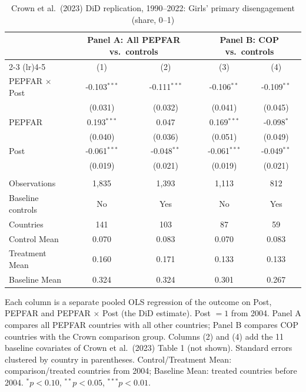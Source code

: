 
\begin{table}[htbp]
   \caption{\label{tab:crown_did_prim_disengage_girls} Crown et al.\ (2023) DiD replication, 1990--2022: Girls' primary disengagement (share, 0--1)}
   \bigskip
   \centering
   \begin{tabular}{lcccc}
      \toprule
       & \multicolumn{2}{c}{Panel A: All PEPFAR vs.\ controls} & \multicolumn{2}{c}{Panel B: COP vs.\ controls} \\ \cmidrule(lr){2-3} \cmidrule(lr){4-5}
                            & (1)            & (2)            & (3)            & (4)\\  
      \midrule 
      PEPFAR $\times$ Post  & -0.103$^{***}$ & -0.111$^{***}$ & -0.106$^{**}$  & -0.109$^{**}$\\   
                            & (0.031)        & (0.032)        & (0.041)        & (0.045)\\   
      PEPFAR                & 0.193$^{***}$  & 0.047          & 0.169$^{***}$  & -0.098$^{*}$\\   
                            & (0.040)        & (0.036)        & (0.051)        & (0.049)\\   
      Post                  & -0.061$^{***}$ & -0.048$^{**}$  & -0.061$^{***}$ & -0.049$^{**}$\\   
                            & (0.019)        & (0.021)        & (0.019)        & (0.021)\\   
       \\
      Observations          & 1,835          & 1,393          & 1,113          & 812\\  
      Baseline controls     & No             & Yes            & No             & Yes\\  
      Countries             & 141            & 103            & 87             & 59\\  
      Control Mean          & 0.070          & 0.083          & 0.070          & 0.083\\  
      Treatment Mean        & 0.160          & 0.171          & 0.133          & 0.133\\  
      Baseline Mean         & 0.324          & 0.324          & 0.301          & 0.267\\  
      \bottomrule
   \end{tabular}
   
   \par \raggedright 
   Each column is a separate pooled OLS regression of the outcome on Post, PEPFAR and PEPFAR $\times$ Post (the DiD estimate). Post $= 1$ from 2004. Panel A compares all PEPFAR countries with all other countries; Panel B compares COP countries with the Crown comparison group. Columns (2) and (4) add the 11 baseline covariates of Crown et al.\ (2023) Table 1 (not shown). Standard errors clustered by country in parentheses. Control/Treatment Mean: comparison/treated countries from 2004; Baseline Mean: treated countries before 2004. $^{*}p<0.10$, $^{**}p<0.05$, $^{***}p<0.01$.
\end{table}


